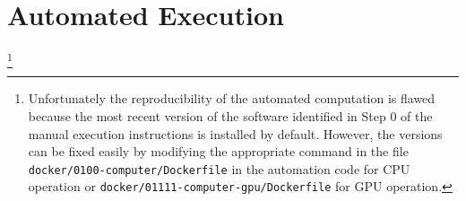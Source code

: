 \section[Automated Execution]{Automated Execution%
\protect\footnotemark[1]
}
\footnote{
Unfortunately the reproducibility of the automated computation is flawed because the most recent version of the software identified in Step 0 of the manual execution instructions is installed by default.
%
However, the versions can be fixed easily by modifying the appropriate command in the file \texttt{docker/0100-computer/Dockerfile} in the automation code for CPU operation or \texttt{docker/01111-computer-gpu/Dockerfile} for GPU operation.
}


